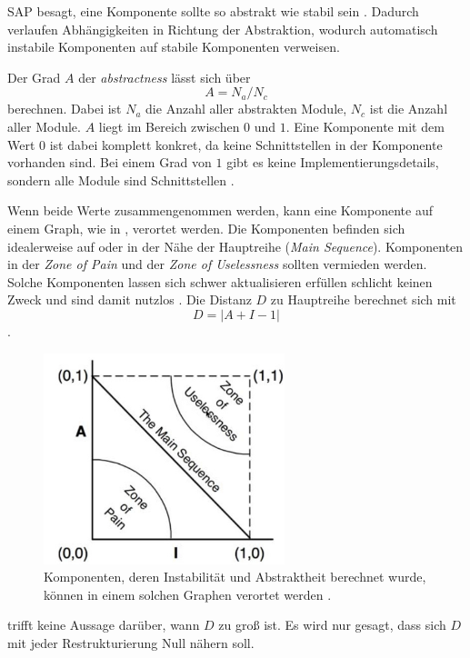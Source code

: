 \ac{SAP} besagt, eine Komponente sollte so abstrakt wie stabil sein \citep[vgl.][126]{martin2018}. Dadurch verlaufen Abhängigkeiten in Richtung der Abstraktion, wodurch automatisch instabile Komponenten auf stabile Komponenten verweisen. 

Der Grad $A$ der \textit{abstractness} lässt sich über 
\begin{equation}
A = N_a/N_c
\end{equation}
berechnen. Dabei ist $N_a$ die Anzahl aller abstrakten Module, $N_c$ ist die Anzahl aller Module. $A$ liegt im Bereich zwischen $0$ und $1$. Eine Komponente mit dem Wert $0$ ist dabei komplett konkret, da keine Schnittstellen in der Komponente vorhanden sind. Bei einem Grad von $1$ gibt es keine Implementierungsdetails, sondern alle Module sind Schnittstellen \citep[vgl.][127]{martin2018}.



Wenn beide Werte zusammengenommen werden, kann eine Komponente auf einem Graph, wie in , verortet werden. Die Komponenten befinden sich idealerweise auf oder in der Nähe der Hauptreihe (\textit{Main Sequence}). Komponenten in der \textit{Zone of Pain} und der \textit{Zone of Uselessness} sollten vermieden werden. Solche Komponenten lassen sich schwer aktualisieren \bzw erfüllen schlicht keinen Zweck und sind damit nutzlos \citep[vgl.][128\psqq]{martin2018}. Die Distanz $D$ zu Hauptreihe berechnet sich mit 
\begin{equation}
D = |A + I -1|
\end{equation}
\citep[vgl.][130]{martin2018}.

\begin{figure}
  \centering
  \includegraphics[width=7cm]{res/i_a_graph.jpg}
   \caption{Komponenten, deren Instabilität und Abstraktheit berechnet wurde, können in einem solchen Graphen verortet werden \citep[][128]{martin2018}.}
   \label{fig:i_a_graph}
\end{figure}


 trifft keine Aussage darüber, wann $D$ zu groß ist. Es wird nur gesagt, dass sich $D$ mit jeder Restrukturierung Null nähern soll.
